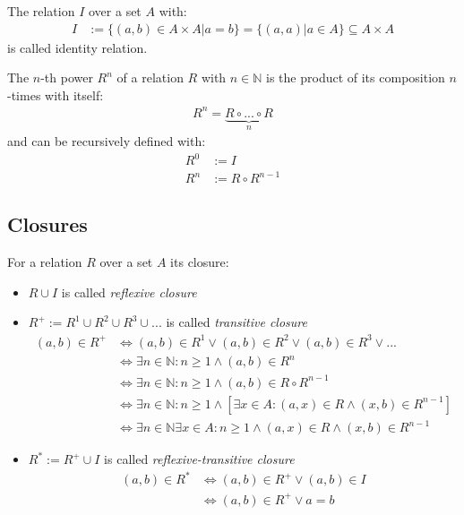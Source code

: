 \begin{definition}
The relation $I$ over a set $A$ with:
\begin{align}
I &:= \{ (a,b) \in A \times A | a = b \} = \{ (a,a) | a \in A \} \subseteq A \times A
\end{align}
is called identity relation.
\end{definition}

The $n$-th power $R^n$ of a relation $R$ with $n \in \mathbb{N}$ is the product of its composition $n$-times with itself:
\begin{align}
R^n = \underbrace{R \circ ... \circ R}_{n}
\end{align}
and can be recursively defined with:
\begin{align}
R^{0} &:= I
\\R^{n} &:= R \circ R^{n-1}
\end{align}


\subsection{Closures}
For a relation $R$ over a set $A$ its closure:
\begin{itemize}
\item
$R \cup I$
is called \textit{reflexive closure}

\item
$R^{+} := R^{1} \cup R^{2} \cup R^{3} \cup ...$
is called \textit{transitive closure}
\begin{align}
(a,b) \in R^{+} 
&\Leftrightarrow 
(a,b) \in R^{1} \vee (a,b) \in R^{2} \vee (a,b) \in R^{3} \vee ...
\\&\Leftrightarrow 
\exists n \in \mathbb{N} : n \geq 1 \wedge (a,b) \in R^{n}
\\&\Leftrightarrow 
\exists n \in \mathbb{N} : n \geq 1 \wedge (a,b) \in R \circ R^{n-1}
\\&\Leftrightarrow 
\exists n \in \mathbb{N} : n \geq 1 \wedge [\exists x \in A : (a,x) \in R \wedge (x,b) \in R^{n-1} ]
\\&\Leftrightarrow 
\exists n \in \mathbb{N} \exists x \in A : n \geq 1 \wedge (a,x) \in R \wedge (x,b) \in R^{n-1}
\end{align}

\item
$R^{*} := R^{+} \cup I$
is called \textit{reflexive-transitive closure}
\begin{align}
(a,b) \in R^{*}
&\Leftrightarrow 
(a,b) \in R^{+} \vee (a,b) \in I
\\&\Leftrightarrow 
(a,b) \in R^{+} \vee a = b
\end{align}
\end{itemize}
